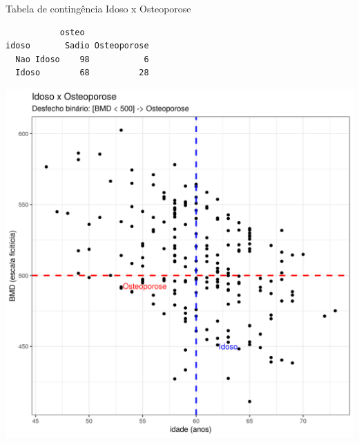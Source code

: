 \documentclass{beamer}
\begin{document}
\begin{frame}[fragile]{}
  \begin{exampleblock}{\small Tabela de contingência Idoso x Osteoporose}
    \tiny
\begin{verbatim}
           osteo
idoso       Sadio Osteoporose
  Nao Idoso    98           6
  Idoso        68          28
\end{verbatim}
  \end{exampleblock}
  \begin{center}
    \includegraphics[height=.6\textheight]{Cap31-32/pratica-glm4}
  \end{center}

\end{frame}
\end{document}
